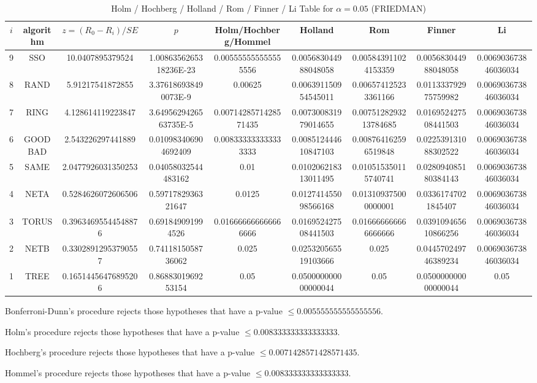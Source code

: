 \documentclass[a4paper,10pt]{article}
\begin{document}
\begin{landscape}
\begin{table}[!htp]
\centering\scriptsize
\caption{Holm / Hochberg / Holland / Rom / Finner / Li Table for $\alpha=0.05$ (FRIEDMAN)}
\begin{tabular}{ccccccccc}
$i$&algorithm&$z=(R_0 - R_i)/SE$&$p$&Holm/Hochberg/Hommel&Holland&Rom&Finner&Li\\
\hline
9& SSO&10.0407895379524&1.0086356265318236E-23&0.005555555555555556&0.005683044988048058&0.005843911024153359&0.005683044988048058&0.006903673846036034\\
8& RAND&5.91217541872855&3.376186938490073E-9&0.00625&0.006391150954545011&0.006574125233361166&0.011333792975759982&0.006903673846036034\\
7& RING&4.128614119223847&3.6495629426563735E-5&0.0071428571428571435&0.007300831979014655&0.0075128293213784685&0.016952427508441503&0.006903673846036034\\
6& GOODBAD&2.543226297441889&0.010983406904692409&0.008333333333333333&0.008512444610847103&0.008764162596519848&0.022539131088302522&0.006903673846036034\\
5& SAME&2.0477926031350253&0.04058032544483162&0.01&0.010206218313011495&0.010515350115740741&0.028094085180384143&0.006903673846036034\\
4& NETA&0.5284626072606506&0.5971782936321647&0.0125&0.012741455098566168&0.013109375000000001&0.03361747021845407&0.006903673846036034\\
3& TORUS&0.39634695544548876&0.691849091994526&0.016666666666666666&0.016952427508441503&0.016666666666666666&0.039109465610866256&0.006903673846036034\\
2& NETB&0.33028912953790557&0.7411815058736062&0.025&0.025320565519103666&0.025&0.044570249746389234&0.006903673846036034\\
1& TREE&0.16514456476895206&0.8688301969253154&0.05&0.050000000000000044&0.05&0.050000000000000044&0.05\\
\hline
\end{tabular}
\end{table}
Bonferroni-Dunn's procedure rejects those hypotheses that have a p-value $\le0.005555555555555556$.


Holm's procedure rejects those hypotheses that have a p-value $\le0.008333333333333333$.


Hochberg's procedure rejects those hypotheses that have a p-value $\le0.0071428571428571435$.


Hommel's procedure rejects those hypotheses that have a p-value $\le0.008333333333333333$.



\end{landscape}
\end{document}
